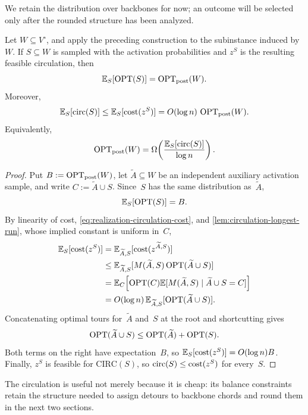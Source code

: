 \documentclass[12pt,a4paper,oneside]{report}
\begin{document}
We retain the distribution over backbones for now; an outcome will be selected
only after the rounded structure has been analyzed.

\begin{theorem}
\label{thm:average-circulation-lower-bound}
Let $W\subseteq V^\circ$, and apply the preceding construction to the
subinstance induced by~$W$.  If $S\subseteq W$ is sampled with the activation
probabilities and $z^S$ is the resulting feasible circulation, then
\[
    \mathbb{E}_S[\operatorname{OPT}(S)]=\operatorname{OPT}_\mathrm{post}(W).
\]
Moreover,
\[
    \mathbb{E}_S[\operatorname{circ}(S)]
    \le \mathbb{E}_S[\operatorname{cost}(z^S)]
    =O(\log n)\,\operatorname{OPT}_\mathrm{post}(W).
\]
Equivalently,
\[
    \operatorname{OPT}_\mathrm{post}(W)
    =\Omega\!\left(
      \frac{\mathbb{E}_S[\operatorname{circ}(S)]}{\log n}
    \right).
\]
\end{theorem}

\begin{proof}
Put $B:=\operatorname{OPT}_\mathrm{post}(W)$, let $\widetilde A\subseteq W$ be an independent
auxiliary activation sample, and write $C:=\widetilde A\cup S$.  Since~$S$
has the same distribution as~$\widetilde A$,
\[
    \mathbb{E}_S[\operatorname{OPT}(S)]=B.
\]
By linearity of cost, \cref{eq:realization-circulation-cost}, and
\cref{lem:circulation-longest-run}, whose implied constant is uniform in~$C$,
\begin{align*}
    \mathbb{E}_S[\operatorname{cost}(z^S)]
    &=\mathbb{E}_{\widetilde A,S}[\operatorname{cost}(z^{\widetilde A,S})]\\
    &\le \mathbb{E}_{\widetilde A,S}
       [M(\widetilde A,S)\operatorname{OPT}(\widetilde A\cup S)]\\
    &=\mathbb{E}_C\!\left[
        \operatorname{OPT}(C)\mathbb{E}[M(\widetilde A,S)\mid \widetilde A\cup S=C]
      \right]\\
    &= O(\log n)\,
       \mathbb{E}_{\widetilde A,S}[\operatorname{OPT}(\widetilde A\cup S)].
\end{align*}
Concatenating optimal tours for~$\widetilde A$ and~$S$ at the root and
shortcutting gives
\[
    \operatorname{OPT}(\widetilde A\cup S)
    \le \operatorname{OPT}(\widetilde A)+\operatorname{OPT}(S).
\]
Both terms on the right have expectation~$B$, so
$\mathbb{E}_S[\operatorname{cost}(z^S)]=O(\log n)B$.
Finally, $z^S$ is feasible for $\mathrm{CIRC}(S)$, so
$\operatorname{circ}(S)\le\operatorname{cost}(z^S)$ for every~$S$.
\end{proof}

The circulation is useful not merely because it is cheap: its balance
constraints retain the structure needed to assign detours to backbone chords
and round them in the next two sections.

\iffalse
\end{document}
